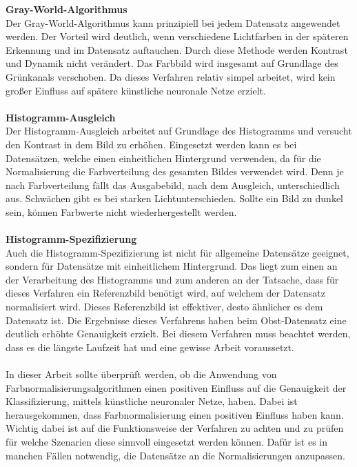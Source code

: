 \textbf{Gray-World-Algorithmus}\\
Der Gray-World-Algorithmus kann prinzipiell bei jedem Datensatz angewendet werden. Der Vorteil wird deutlich, wenn verschiedene Lichtfarben in der späteren Erkennung und im Datensatz auftauchen. Durch diese Methode werden Kontrast und Dynamik nicht verändert. Das Farbbild wird insgesamt auf Grundlage des Grünkanals verschoben. Da dieses Verfahren relativ simpel arbeitet, wird kein großer Einfluss auf spätere künstliche neuronale Netze erzielt.\\\\
\textbf{Histogramm-Ausgleich}\\
Der Histogramm-Ausgleich arbeitet auf Grundlage des Histogramms und versucht den Kontrast in dem Bild zu erhöhen. Eingesetzt werden kann es bei Datensätzen, welche einen einheitlichen Hintergrund verwenden, da für die Normalisierung die Farbverteilung des gesamten Bildes verwendet wird. Denn je nach Farbverteilung fällt das Ausgabebild, nach dem Ausgleich, unterschiedlich aus. Schwächen gibt es bei starken Lichtunterschieden. Sollte ein Bild zu dunkel sein, können Farbwerte nicht wiederhergestellt werden.\\\\
\textbf{Histogramm-Spezifizierung}\\
Auch die Histogramm-Spezifizierung ist nicht für allgemeine Datensätze geeignet, sondern für Datensätze mit einheitlichem Hintergrund. Das liegt zum einen an der Verarbeitung des Histogramms und zum anderen an der Tatsache, dass für dieses Verfahren ein Referenzbild benötigt wird, auf welchem der Datensatz normalisiert wird. Dieses Referenzbild ist effektiver, desto ähnlicher es dem Datensatz ist. Die Ergebnisse dieses Verfahrens haben beim Obst-Datensatz eine deutlich erhöhte Genauigkeit erzielt. Bei diesem Verfahren muss beachtet werden, dass es die längste Laufzeit hat und eine gewisse Arbeit voraussetzt.\\\\
In dieser Arbeit sollte überprüft werden, ob die Anwendung von Farbnormalisierungsalgorithmen einen positiven Einfluss auf die Genauigkeit der Klassifizierung, mittels künstliche neuronaler Netze, haben. Dabei ist herausgekommen, dass Farbnormalisierung einen positiven Einfluss haben kann. Wichtig dabei ist auf die Funktionsweise der Verfahren zu achten und zu prüfen für welche Szenarien diese sinnvoll eingesetzt werden können. Dafür ist es in manchen Fällen notwendig, die Datensätze an die Normalisierungen anzupassen.\\\\
